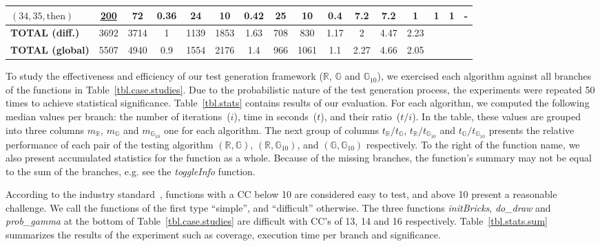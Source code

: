 \documentclass[sigconf,review]{acmart}
\newcommand{\thenBr}{\text{then}}
\newcommand{\un}[1]{\underline{#1}}
\newcommand{\Random}{\mathbb{R}}
\newcommand{\Genetic}{\mathbb{G}}
\newcommand{\RGenetic}{\mathbb{G}_{10}}
\begin{document}
\begin{table}[!t]
\begin{tabular}{l|ccc|ccc|ccc|ccc|ccc}
    $(34,35,\thenBr)$        & \un{200} & 72   & 0.36      & 24  & 10   & 0.42          & 25  & 10  & 0.4              & 7.2    & 7.2   & 1      & 1 & 1 &  -  \\
    \midrule
    \textbf{TOTAL (diff.)}           & 3692     & 3714 & 1         & 1139 & 1853 & 1.63         & 708 & 830 & 1.17             & 2      & 4.47  & 2.23   &   &   &    \\
    \bottomrule
    \bottomrule  
    \textbf{TOTAL (global)} & 5507      & 4940 & 0.9       & 1554 & 2176 & 1.4          & 966 & 1061 & 1.1             & 2.27   & 4.66  & 2.05       &   &   &    \\  
    \bottomrule
    \end{tabular}
\end{table}

To study the effectiveness and efficiency of our test generation framework ($\Random$, $\Genetic$ and $\RGenetic$), we exercised each algorithm against all branches of the functions in Table~\ref{tbl.case.studies}. Due to the probabilistic nature of the test generation process, the experiments were repeated 50 times to achieve statistical significance. Table~\ref{tbl.stats} contains results of our evaluation. For each algorithm, we computed the following median values per branch: the number of iterations~($i$), time in seconds~($t$), and their ratio~($t/i$). In the table, these values are grouped into three columns $m_{\Random}$, $m_{\Genetic}$ and $m_{\RGenetic}$ one for each algorithm. The next group of columns $t_{\Random}/t_{\Genetic}$, $t_{\Random}/t_{\RGenetic}$ and $t_{\Genetic}/t_{\RGenetic}$ presents the relative performance of each pair of the testing algorithm $(\Random,\Genetic)$, $(\Random,\RGenetic)$, and $(\Genetic,\RGenetic)$ respectively. To the right of the function name, we also present accumulated statistics for the function as a whole. Because of the missing branches, the function's summary may not be equal to the sum of the branches, e.g. see the \emph{toggleInfo} function. 

According to the industry standard~\cite{bray1997c4}, functions with a CC below 10 are considered easy to test, and above 10 present a reasonable challenge. We call the functions of the first type ``simple'', and ``difficult'' otherwise. The three functions \emph{initBricks}, \emph{do_draw} and \emph{prob_gamma} at the bottom of Table~\ref{tbl.case.studies} are difficult with CC's of 13, 14 and 16 respectively. Table~\ref{tbl.stats.sum} summarizes the results of the experiment such as coverage, execution time per branch and significance.
\end{document}
